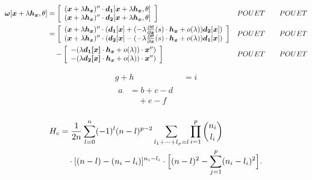\begin{align}
	\boldsymbol{\omega}[\boldsymbol{x}+\lambda \boldsymbol{h_x},\theta] & = 
	\left[\begin{array}{c}
		(\boldsymbol{x}+\lambda \boldsymbol{h_x})'' \cdot  \boldsymbol{d_1}[\boldsymbol{x}+\lambda \boldsymbol{h_x},\theta]\\
		(\boldsymbol{x}+\lambda \boldsymbol{h_x})'' \cdot \boldsymbol{d_2}[\boldsymbol{x}+\lambda \boldsymbol{h_x},\theta]\\
	\end{array}\right] && POUET &&& POUET\notag\\
& = 
\left[\begin{array}{c}
	(\boldsymbol{x}+\lambda \boldsymbol{h_x})'' \cdot ( 	\boldsymbol{d_1}[\boldsymbol{x}] 
												+ (-\lambda\frac{\partial \theta}{\partial \boldsymbol{x}}(s) \cdot \boldsymbol{h_x} + o(\lambda))\boldsymbol{d_2}[\boldsymbol{x}]
											)\\
	(\boldsymbol{x}+\lambda \boldsymbol{h_x})'' \cdot ( 	\boldsymbol{d_2}[\boldsymbol{x}] 
												- (-\lambda\frac{\partial \theta}{\partial \boldsymbol{x}}(s) \cdot \boldsymbol{h_x} + o(\lambda))\boldsymbol{d_1}[\boldsymbol{x}]
											)\\
	\end{array}\right] && POUET &&& POUET\notag\\
& \quad- 
\left[\begin{array}{c}
												- (\lambda \boldsymbol{d_1[\boldsymbol{x}]}\cdot\boldsymbol{h_x} + o(\lambda)) \cdot \boldsymbol{x}''
											)\\
												- (\lambda \boldsymbol{d_2[\boldsymbol{x}]}\cdot\boldsymbol{h_x} + o(\lambda)) \cdot \boldsymbol{x}''
											)\\
	\end{array}\right] && POUET &&& POUET\notag\\
\end{align}



\begin{align}
  g + h & = i \\
  \begin{split}
      a & = b + c - d \\
        & \quad + e - f
  \end{split} \\
\end{align}

\begin{equation}\label{e:barwq}\begin{split}
H_c&=\frac{1}{2n} \sum^n_{l=0}(-1)^{l}(n-{l})^{p-2}
\sum_{l _1+\dots+ l _p=l}\prod^p_{i=1} \binom{n_i}{l _i}\\ 
&\quad\cdot[(n-l )-(n_i-l _i)]^{n_i-l _i}\cdot
\Bigl[(n-l )^2-\sum^p_{j=1}(n_i-l _i)^2\Bigr].
\end{split}\end{equation}

